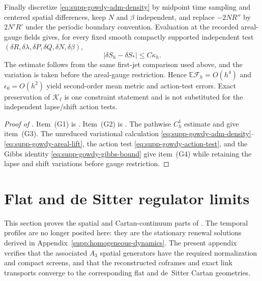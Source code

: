 \documentclass[11pt]{article}
\theoremstyle{definition}
\theoremstyle{remark}
\begin{document}
Finally discretize \eqref{eq:supp-gowdy-adm-density} by midpoint time sampling
and centered spatial differences, keep $N$ and $\beta$ independent, and replace
$-2NR''$ by $2N'R'$ under the periodic boundary convention.  Evaluation at the
recorded areal-gauge fields gives, for every fixed smooth compactly supported
independent test $(\delta R,\delta\lambda,\delta P,\delta Q,\delta N,\delta\beta)$,
\begin{equation}
 \boxed{|\delta S_h-\delta S_*|\le C\kappa_h.}
 \label{eq:supp-gowdy-action-test}
\end{equation}
The estimate follows from the same first-jet comparison used above, and the
variation is taken before the areal-gauge restriction.  Hence
$\mathbb E\mathcal F_h=O(h^4)$ and $\epsilon_0=O(h^2)$ yield second-order mean
metric and action-test errors.  Exact preservation of
$\mathcal K_\ell$ is one constraint statement and is not substituted for the
independent lapse/shift action tests.

\begin{proof}[Proof of ]
Item~\textup{(G1)} is .  Item~\textup{(G2)} is
.  The pathwise $C_h^1$ estimate and
 give item~\textup{(G3)}.  The unreduced
variational calculation
\eqref{eq:supp-gowdy-adm-density}--\eqref{eq:supp-gowdy-areal-lift}, the action
test \eqref{eq:supp-gowdy-action-test}, and the Gibbs identity
\eqref{eq:supp-gowdy-gibbs-bound} give item~\textup{(G4)} while retaining the
lapse and shift variations before gauge restriction.
\end{proof}

\section{Flat and de Sitter regulator limits}
\label{supp:vacuum}

This section proves the spatial and Cartan-continuum parts of
.  The temporal profiles are no longer posited here: they are
the stationary renewal solutions derived in
Appendix~\ref{supp:homogeneous-dynamics}.  The present appendix verifies that
the associated $A_3$ spatial generators have the required normalization and
compact screens, and that the reconstructed coframes and exact link transports
converge to the corresponding flat and de~Sitter Cartan geometries.
\end{document}
